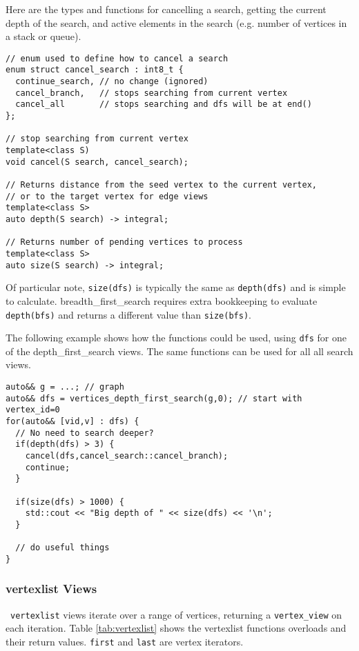 \documentclass[10pt,onecolumn]{article}
\newcommand{\tcode}[1]{\lstinline[breaklines=true]{#1}}
\begin{document}
Here are the types and functions for cancelling a search, getting the current depth of the search, and active elements in the search (e.g. number of vertices in a stack or queue).
\begin{lstlisting}
// enum used to define how to cancel a search
enum struct cancel_search : int8_t { 
  continue_search, // no change (ignored)
  cancel_branch,   // stops searching from current vertex
  cancel_all       // stops searching and dfs will be at end()
};

// stop searching from current vertex
template<class S)
void cancel(S search, cancel_search);

// Returns distance from the seed vertex to the current vertex, 
// or to the target vertex for edge views
template<class S>
auto depth(S search) -> integral;

// Returns number of pending vertices to process
template<class S>
auto size(S search) -> integral; 
\end{lstlisting}

Of particular note, \tcode{size(dfs)} is typically the same as \tcode{depth(dfs)} and is simple to calculate. breadth\_first\_search requires extra bookkeeping to evaluate \tcode{depth(bfs)} and returns a different value than \tcode{size(bfs)}.

The following example shows how the functions  could be used, using \tcode{dfs} for one of the depth\_first\_search views. The same functions can be used for all all search views.
\begin{lstlisting}
auto&& g = ...; // graph
auto&& dfs = vertices_depth_first_search(g,0); // start with vertex_id=0
for(auto&& [vid,v] : dfs) {
  // No need to search deeper?
  if(depth(dfs) > 3) {
    cancel(dfs,cancel_search::cancel_branch);
    continue;
  }
  
  if(size(dfs) > 1000) {
    std::cout << "Big depth of " << size(dfs) << '\n';
  }
  
  // do useful things
}

\end{lstlisting}

\subsubsection{vertexlist Views}
\
\tcode{vertexlist} views iterate over a range of vertices, returning a \tcode{vertex_view} on each iteration. 
Table \ref{tab:vertexlist} shows the vertexlist functions overloads and their return values. \tcode{first} and \tcode{last} are vertex iterators.
\end{document}
